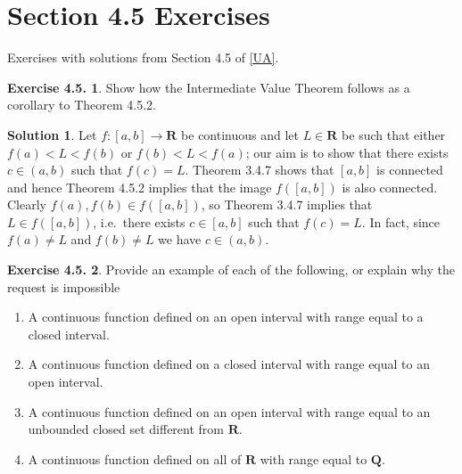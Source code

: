 \documentclass[12pt]{article}
\theoremstyle{definition}
\theoremstyle{exercise}
\newtheorem{exercise}{Exercise 4.5.}
\theoremstyle{solution}
\newtheorem*{solution}{Solution}
\newcommand{\Q}{\mathbf{Q}}
\newcommand{\R}{\mathbf{R}}
\begin{document}
\section{Section 4.5 Exercises}

Exercises with solutions from Section 4.5 of \hyperlink{ua}{[UA]}.

\begin{exercise}
\label{ex:1}
    Show how the Intermediate Value Theorem follows as a corollary to Theorem 4.5.2.
\end{exercise}

\begin{solution}
    Let \( f : [a, b] \to \R \) be continuous and let \( L \in \R \) be such that either \( f(a) < L < f(b) \) or \( f(b) < L < f(a) \); our aim is to show that there exists \( c \in (a, b) \) such that \( f(c) = L \). Theorem 3.4.7 shows that \( [a, b] \) is connected and hence Theorem 4.5.2 implies that the image \( f([a, b]) \) is also connected. Clearly \( f(a), f(b) \in f([a, b]) \), so Theorem 3.4.7 implies that \( L \in f([a, b]) \), i.e.\ there exists \( c \in [a, b] \) such that \( f(c) = L \). In fact, since \( f(a) \neq L \) and \( f(b) \neq L \) we have \( c \in (a, b) \).
\end{solution}

\begin{exercise}
\label{ex:2}
    Provide an example of each of the following, or explain why the request is impossible
    \begin{enumerate}
        \item A continuous function defined on an open interval with range equal to a closed interval.

        \item A continuous function defined on a closed interval with range equal to an open interval.

        \item A continuous function defined on an open interval with range equal to an unbounded closed set different from \( \R \).

        \item A continuous function defined on all of \( \R \) with range equal to \( \Q \).
    \end{enumerate}
\end{exercise}
\end{document}
